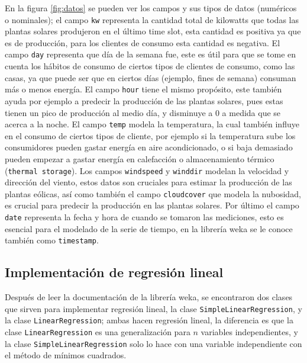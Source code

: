 En la figura \ref{fig:datos} se pueden ver los campos y sus tipos de datos (numéricos o nominales); el campo \texttt{kw} representa la cantidad total de kilowatts que todas las plantas solares produjeron en el último time slot, esta cantidad es positiva ya que es de producción, para los clientes de consumo esta cantidad es negativa. El campo \texttt{day} representa que día de la semana fue, este es útil para que se tome en cuenta los hábitos de consumo de ciertos tipos de clientes de consumo, como las casas, ya que puede ser que en ciertos días (ejemplo, fines de semana) consuman más o menos energía. El campo \texttt{hour} tiene el mismo propósito, este también ayuda por ejemplo a predecir la producción de las plantas solares, pues estas tienen un pico de producción al medio día, y disminuye a 0 a medida que se acerca a la noche. El campo \texttt{temp} modela la temperatura, la cual también influye en el consumo de ciertos tipos de cliente, por ejemplo si la temperatura sube los consumidores pueden gastar energía en aire acondicionado, o si baja demasiado pueden empezar a gastar energía en calefacción o almacenamiento térmico (\texttt{thermal storage}). 
Los campos \texttt{windspeed} y \texttt{winddir} modelan la velocidad y dirección del viento, estos datos son cruciales para estimar la producción de las plantas eólicas, así como también el campo \texttt{cloudcover} que modela la nubosidad, es crucial para predecir la producción en las plantas solares. 
Por último el campo \texttt{date} representa la fecha y hora de cuando se tomaron las mediciones, esto es esencial para el modelado de la serie de tiempo, en la librería weka se le conoce también como \texttt{timestamp}.

\subsection{Implementación de regresión lineal}
Después de leer la documentación de la librería weka, se encontraron dos clases que sirven para implementar regresión lineal, la clase \texttt{SimpleLinearRegression}, y la clase \texttt{LinearRegression}; 
ambas hacen regresión lineal, la diferencia es que la clase \texttt{LinearRegression} es una generalización para $n$ variables independientes, y la clase \texttt{SimpleLinearRegression} solo lo hace con una variable independiente con el método de mínimos cuadrados.

